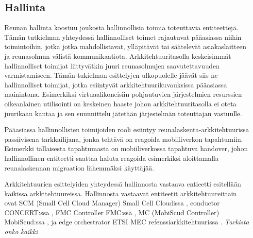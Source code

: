 \subsection{Hallinta}




Reunan hallinta koostuu joukosta hallinnollisia toimia toteuttavia entiteettejä. Tämän tutkielman yhteydessä hallinnolliset toimet rajautuvat pääasiassa niihin toimintoihin, jotka jotka mahdollistavat, ylläpitävät tai säätelevät asiakaslaitteen ja reunasolmun välistä kommunikaatiota. Arkkitehtuuritasolla keskeisimmät hallinnolliset toimijat liittyvätkin juuri reunasolmujen saavutettavuuden varmistamiseen.
Tämän tukielman esittelyjen ulkopuolelle jäävät siis ne hallinnolliset toimijat, jotka esiintyvät arkkitehtuurikuvauksissa pääasiassa mainintana. Esimerkiksi virtuaalikoneisiin pohjautuvien järjestelmien resurssien oikeanlainen utilisointi \cite{yousaf16fine, taleb2017multi} on keskeinen haaste johon arkkitehtuuritasolla ei oteta juurikaan kantaa ja sen suunnittelu jätetään järjestelmän toteuttajan vastuulle.

Pääasiassa hallinnollisten toimijoiden rooli esiintyy reunalaskenta-arkkitehtuurissa passiivisena tarkkailijana, jonka tehtävä on reagoida mobiiliverkon tapahtumiin. 
Esimerkki tällaisesta tapahtumasta on mobiiliverkossa tapahtuva handover, johon hallinnollinen entiteetti saattaa haluta reagoida esimerkiksi aloittamalla reunalaskennan migraation lähemmäksi käyttäjää. 

Arkkitehtuurien esittelyiden yhteydessä hallinnosta vastaava entieetti esitellään kaikissa arkkitehtuureissa. Hallinnosta vastaavat entiteetit arkkitehtuureittain ovat SCM (Small Cell Cloud Manager) Small Cell Cloudissa \cite{lobillo15scc, gambetti15dist}, conductor CONCERT:ssa \cite{liu2014concert}, FMC Controller FMC:ssä \cite{taleb2013follow}, MC (MobiScud Controller) MobiScud:ssa \cite{wang2015mobiscud}, ja edge orchestrator ETSI MEC refenssiarkkitehtuurissa \cite{etsirefarch}. \textit{Tarkista onko kaikki}

